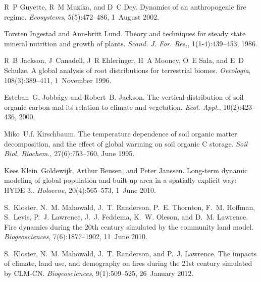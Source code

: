 \begin{DoxyDescription}
\item[\label{_CITEREF_Guyette2002-rc}%
\mbox{[}24\mbox{]}]R~P Guyette, R~M Muzika, and D~C Dey. Dynamics of an anthropogenic fire regime. {\itshape Ecosystems}, 5(5)\+:472--486, 1~August 2002. 


\item[\label{_CITEREF_Ingestad1986-td}%
\mbox{[}25\mbox{]}]Torsten Ingestad and Ann-\/britt Lund. Theory and techniques for steady state mineral nutrition and growth of plants. {\itshape Scand. J. For. Res.}, 1(1-\/4)\+:439--453, 1986. 


\item[\label{_CITEREF_Jackson1996-va}%
\mbox{[}26\mbox{]}]R~B Jackson, J~Canadell, J~R Ehleringer, H~A Mooney, O~E Sala, and E~D Schulze. A global analysis of root distributions for terrestrial biomes. {\itshape Oecologia}, 108(3)\+:389--411, 1~November 1996. 


\item[\label{_CITEREF_Jobbagy2000-pa}%
\mbox{[}27\mbox{]}]Esteban~G. Jobbágy and Robert~B. Jackson. The vertical distribution of soil organic carbon and its relation to climate and vegetation. {\itshape Ecol. Appl.}, 10(2)\+:423--436, 2000. 


\item[\label{_CITEREF_Kirschbaum1995-db}%
\mbox{[}28\mbox{]}]Miko~U.\+f. Kirschbaum. The temperature dependence of soil organic matter decomposition, and the effect of global warming on soil organic C storage. {\itshape Soil Biol. Biochem.}, 27(6)\+:753--760, June 1995. 


\item[\label{_CITEREF_Klein_Goldewijk2010-lh}%
\mbox{[}29\mbox{]}]Kees Klein~Goldewijk, Arthur Beusen, and Peter Janssen. Long-\/term dynamic modeling of global population and built-\/up area in a spatially explicit way\+: H\+Y\+D\+E 3.. {\itshape Holocene}, 20(4)\+:565--573, 1~June 2010. 


\item[\label{_CITEREF_Kloster2010-633}%
\mbox{[}30\mbox{]}]S.~Kloster, N.~M. Mahowald, J.~T. Randerson, P.~E. Thornton, F.~M. Hoffman, S.~Levis, P.~J. Lawrence, J.~J. Feddema, K.~W. Oleson, and D.~M. Lawrence. Fire dynamics during the 20th century simulated by the community land model. {\itshape Biogeosciences}, 7(6)\+:1877--1902, 11~June 2010. 


\item[\label{_CITEREF_Kloster2012-c79}%
\mbox{[}31\mbox{]}]S.~Kloster, N.~M. Mahowald, J.~T. Randerson, and P.~J. Lawrence. The impacts of climate, land use, and demography on fires during the 21st century simulated by C\+L\+M-\/\+C\+N. {\itshape Biogeosciences}, 9(1)\+:509--525, 26~January 2012. 



\end{DoxyDescription}
